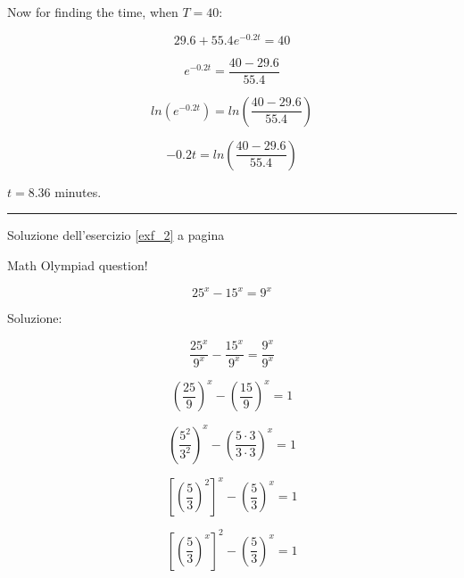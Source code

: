 \begin{minipage}{\textwidth}
Now for finding the time, when $T=40$:


\begin{equation*}
29.6+55.4e^{-0.2t}=40
\end{equation*}


\begin{equation*}
e^{-0.2t}=\frac{40-29.6}{55.4}
\end{equation*}

\begin{equation*}
ln\left(e^{-0.2t}\right)=
ln\left(
\frac{40-29.6}{55.4}
\right)
\end{equation*}

\begin{equation*}
-0.2t=ln\left(
\frac{40-29.6}{55.4}
\right)
\end{equation*}

$t=8.36$ minutes.
\end{minipage}



\vspace{1cm}
\hrule
\vspace{1cm}


Soluzione dell'esercizio \ref{exf_2} a pagina \pageref{exf_2}\label{solf_2}

Math Olympiad question!

\begin{equation*}
25^x-15^x=9^x
\end{equation*}

Soluzione:

\begin{equation*}
\frac{25^x}{9^x}-
\frac{15^x}{9^x}=
\frac{9^x}{9^x}
\end{equation*}

\begin{equation*}
\left(
\frac{25}{9}
\right)^x
-
\left(
\frac{15}{9}
\right)^x
=1
\end{equation*}

\begin{equation*}
\left( \frac{ 5^2}{ 3^2} \right)^x
-
\left(
\frac{5\cdot 3}
{3\cdot 3} 
\right)^x=1
\end{equation*}

\begin{equation*}
\left[ \left( \frac{5}{3} \right)^2 \right]^x
-
\left(
\frac{5}
{3} 
\right)^x=1
\end{equation*}

\begin{equation*}
\left[ \left( \frac{5}{3} \right)^x \right]^2
-
\left(
\frac{5}
{3} 
\right)^x=1
\end{equation*}



